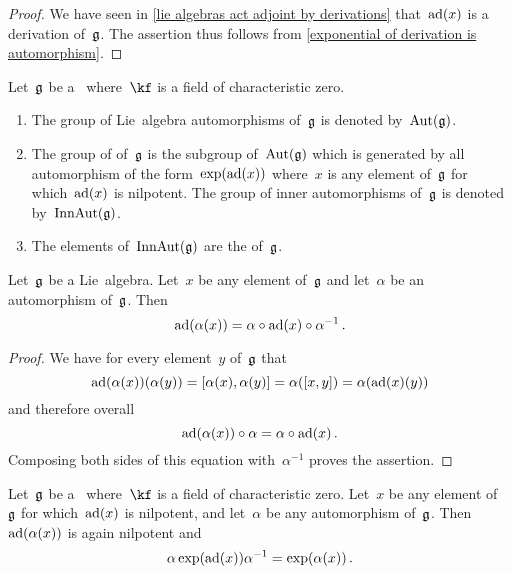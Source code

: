 \begin{proof}
  We have seen in \cref{lie algebras act adjoint by derivations} that~$\operatorname{ad}(x)$ is a derivation of~$\mathfrak{g}$.
  The assertion thus follows from \cref{exponential of derivation is automorphism}.
\end{proof}


\begin{definition}
  Let~$\mathfrak{g}$ be a~\liealgebra{$\kf$} where~$\kf$ is a field of characteristic zero.
  \begin{enumerate}
    \item
      The group of Lie~algebra automorphisms of~$\mathfrak{g}$ is denoted by~$\operatorname{Aut}(\mathfrak{g})$.
    \item
      The group of  of~$\mathfrak{g}$ is the subgroup of~$\operatorname{Aut}(\mathfrak{g})$ which is generated by all automorphism of the form~$\exp(\operatorname{ad}(x))$ where~$x$ is any element of~$\mathfrak{g}$ for which~$\operatorname{ad}(x)$ is nilpotent.
      The group of inner automorphisms of~$\mathfrak{g}$ is denoted by~$\operatorname{InnAut}(\mathfrak{g})$.
    \item
      The elements of~$\operatorname{InnAut}(\mathfrak{g})$ are the  of~$\mathfrak{g}$.
  \end{enumerate}
\end{definition}


\begin{lemma}
  \label{adjoint and automorphisms}
  Let~$\mathfrak{g}$ be a Lie~algebra.
  Let~$x$ be any element of~$\mathfrak{g}$ and let~$\alpha$ be an automorphism of~$\mathfrak{g}$.
  Then
  \[
    \operatorname{ad}(\alpha(x))
    =
    \alpha \circ \operatorname{ad}(x) \circ \alpha^{-1} \,.
  \]
\end{lemma}


\begin{proof}
  We have for every element~$y$ of~$\mathfrak{g}$ that
  \[
    \operatorname{ad}(\alpha(x))(\alpha(y))
    =
    [\alpha(x), \alpha(y)]
    =
    \alpha( [x,y] )
    =
    \alpha( \operatorname{ad}(x)(y) )
  \]
  and therefore overall
  \[
    \operatorname{ad}(\alpha(x)) \circ \alpha
    =
    \alpha \circ \operatorname{ad}(x) \,.
  \]
  Composing both sides of this equation with~$\alpha^{-1}$ proves the assertion.
\end{proof}


\begin{lemma}
  \label{conjugation of inner automorphism}
  Let~$\mathfrak{g}$ be a~\liealgebra{$\kf$} where~$\kf$ is a field of characteristic zero.
  Let~$x$ be any element of~$\mathfrak{g}$ for which~$\operatorname{ad}(x)$ is nilpotent, and let~$\alpha$ be any automorphism of~$\mathfrak{g}$.
  Then~$\operatorname{ad}(\alpha(x))$ is again nilpotent and
  \[
    \alpha \exp(\operatorname{ad}(x)) \alpha^{-1}
    =
    \exp( \alpha(x) ) \,.
  \]
\end{lemma}


